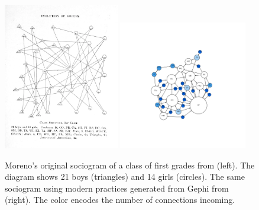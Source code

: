 \begin{figure}
    \centering %
    \includegraphics[width=0.45\textwidth]{static/figures/RelatedWork/Moreno-1}
    \includegraphics[width=0.50\textwidth,trim={4cm 4cm 4cm 4cm},clip]{static/figures/RelatedWork/Moreno-1_GrandJean}
    \caption{Moreno's original sociogram of a class of first grades from \cite{morenoWhoShallSurvive1934} (left). The diagram shows 21 boys (triangles) and 14 girls (circles). The same sociogram using modern practices generated from Gephi from \cite{grandjeanSocialNetworkAnalysis2015} (right). The color encodes the number of connections incoming.}
    \label{fig:moreno-sociogram}
\end{figure}

